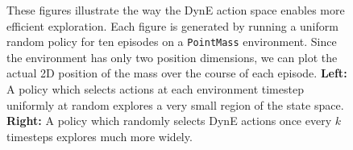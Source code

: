 \begin{figure}[h]
\begin{subfigure}[t]{0.45\textwidth}
\end{subfigure}
\label{fig:exploration}
\caption{These figures illustrate the way the DynE action space enables more efficient exploration. Each figure is generated by running a uniform random policy for ten episodes on a \texttt{PointMass} environment. Since the environment has only two position dimensions, we can plot the actual 2D position of the mass over the course of each episode. \textbf{Left:} A policy which selects actions at each environment timestep uniformly at random explores a very small region of the state space. \textbf{Right:} A policy which randomly selects DynE actions once every $k$ timesteps explores much more widely.}
\end{figure}


\printendnotes